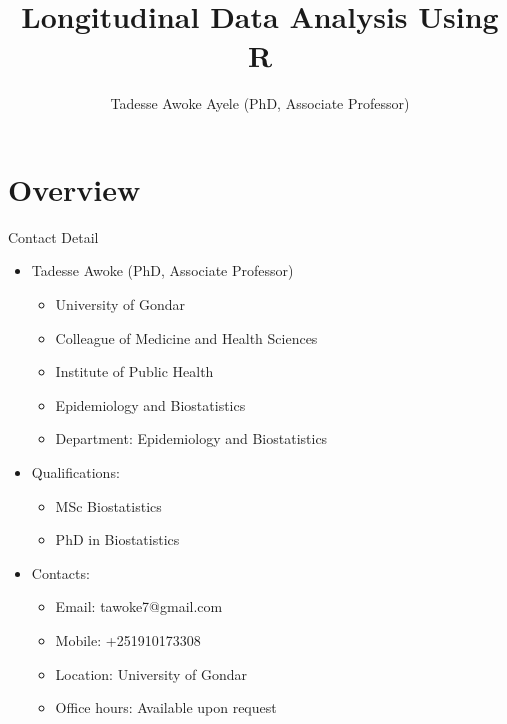\documentclass{beamer}
\title[]{\bfseries\sffamily Longitudinal Data Analysis Using R}
\author[Tadesse A. Ayele]
{\small Tadesse Awoke Ayele (PhD, Associate Professor)}
\institute[Universities of Gondar] %
{
	University of Gonder\\
	\vspace*{2mm}
	Collage of Medicine and Health Sciences\\
	\vspace*{2mm}
	Institute of Public Health
}
\begin{document}



\begin{frame}
  \titlepage
\end{frame}


\section{Overview}
\begin{frame}{Contact Detail}
\begin{itemize}
	\item Tadesse Awoke (PhD, Associate Professor)
	\begin{itemize}
		
		\item University of Gondar
		\item Colleague of Medicine and Health Sciences
		\item Institute of Public Health
		\item Epidemiology and Biostatistics 
		\item Department: Epidemiology and Biostatistics \vspace{0.2cm}
	\end{itemize}
	\item Qualifications:
	\begin{itemize}
		\item  {\color{blue} MSc Biostatistics}
		\item {\color{blue}PhD in Biostatistics} 
	\end{itemize}
	\item Contacts:
	\begin{itemize}
		\item Email: tawoke7@gmail.com 
		\item Mobile: +251910173308 
		\item Location: University of Gondar 
		\item Office hours: Available upon request
	\end{itemize}
\end{itemize}
\end{frame}
\end{document}
